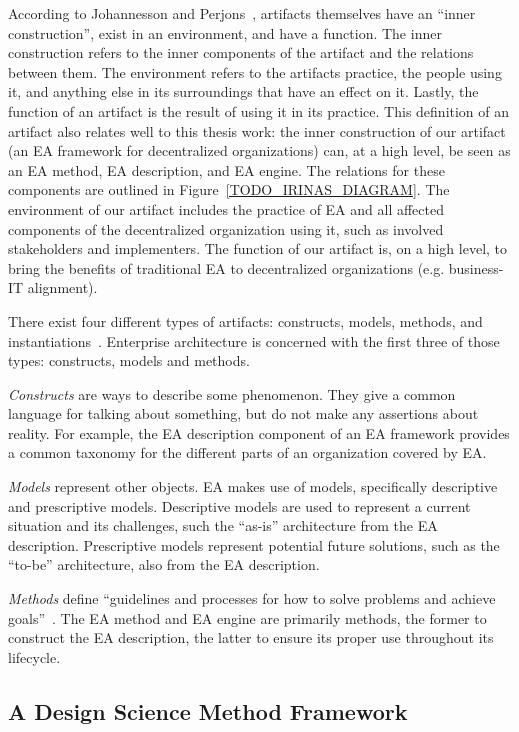 According to Johannesson and Perjons~\cite[Ch. 1]{johannessonPerjons2012}, artifacts themselves have an ``inner construction'', exist in an environment, and have a function. The inner construction refers to the inner components of the artifact and the relations between them. The environment refers to the artifacts practice, the people using it, and anything else in its surroundings that have an effect on it. Lastly, the function of an artifact is the result of using it in its practice. This definition of an artifact also relates well to this thesis work: the inner construction of our artifact (an EA framework for decentralized organizations) can, at a high level, be seen as an EA method, EA description, and EA engine. The relations for these components are outlined in Figure~\ref{TODO_IRINAS_DIAGRAM}. The environment of our artifact includes the practice of EA and all affected components of the decentralized organization using it, such as involved stakeholders and implementers. The function of our artifact is, on a high level, to bring the benefits of traditional EA to decentralized organizations (e.g. business-IT alignment).

There exist four different types of artifacts: constructs, models, methods, and instantiations~\cite{hevner2004,johannessonPerjons2012}. Enterprise architecture is concerned with the first three of those types: constructs, models and methods. 

\textit{Constructs} are ways to describe some phenomenon. They give a common language for talking about something, but do not make any assertions about reality. For example, the EA description component of an EA framework provides a common taxonomy for the different parts of an organization covered by EA. 

\textit{Models} represent other objects. EA makes use of models, specifically descriptive and prescriptive models. Descriptive models are used to represent a current situation and its challenges, such the ``as-is'' architecture from the EA description. Prescriptive models represent potential future solutions, such as the ``to-be'' architecture, also from the EA description.

\textit{Methods} define ``guidelines and processes for how to solve problems and achieve goals''~\cite[Ch. 1]{johannessonPerjons2012}. The EA method and EA engine  are primarily methods, the former to construct the EA description, the latter to ensure its proper use throughout its lifecycle. 

\subsection{A Design Science Method Framework}
\label{sec:framework}

